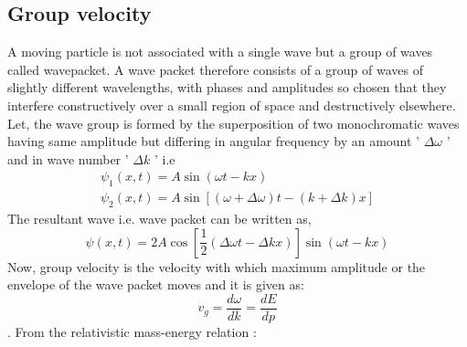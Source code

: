 \subsection{Group velocity}
A moving particle is not associated with a single wave but a group of waves called wavepacket.
A wave packet therefore consists of a
group of waves of slightly different wavelengths, with phases and amplitudes so chosen that
they interfere constructively over a small region of space and destructively elsewhere.
Let, the wave group is formed by the superposition of two monochromatic waves having same amplitude but differing in angular frequency by an amount ' $\Delta \omega$ ' and in wave number ' $\Delta k$ ' i.e
$$
\begin{array}{l}
\psi_{1}(x,t)=A \sin (\omega t-k x) \\
\psi_{2}(x,t)=A \sin [(\omega+\Delta \omega) t-(k+\Delta k) x]
\end{array}
$$
The resultant wave i.e. wave packet can be written as,
$$
\psi(x,t)=2 A \cos \left[\frac{1}{2}(\Delta \omega t-\Delta k x)\right] \sin (\omega t-k x)
$$
Now, group velocity is the velocity with which maximum amplitude or the envelope of the wave packet moves and it is given as: $$v_{g}=\frac{d \omega}{d k}=\frac{d E}{d p}$$.
From the relativistic mass-energy relation :


